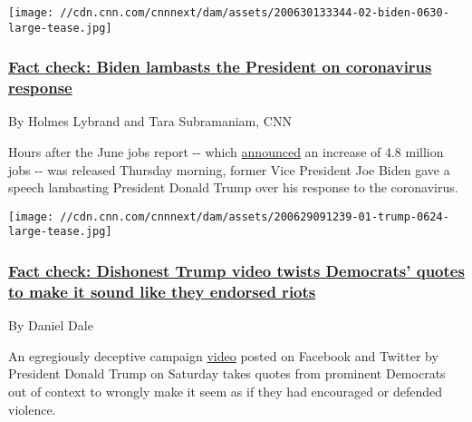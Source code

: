 \texttt{[image: //cdn.cnn.com/cnnnext/dam/assets/200630133344-02-biden-0630-large-tease.jpg]}

\hypertarget{fact-check-biden-lambasts-the-president-on-coronavirus-response-}{%
\subsubsection{\texorpdfstring{\href{/2020/07/03/politics/joe-biden-attacks-donald-trump-on-coronavirus-fact-check/index.html}{Fact
check: Biden lambasts the President on coronavirus response
}}{Fact check: Biden lambasts the President on coronavirus response }}\label{fact-check-biden-lambasts-the-president-on-coronavirus-response-}}

By Holmes Lybrand and Tara Subramaniam, CNN

Hours after the June jobs report -\/- which
\href{https://www.cnn.com/2020/07/02/economy/june-2020-jobs-report-coronavirus/index.html}{announced}
an increase of 4.8 million jobs -\/- was released Thursday morning,
former Vice President Joe Biden gave a speech lambasting President
Donald Trump over his response to the coronavirus.

\href{/2020/06/29/politics/fact-check-dishonest-trump-video-democrats/index.html}{}

\texttt{[image: //cdn.cnn.com/cnnnext/dam/assets/200629091239-01-trump-0624-large-tease.jpg]}

\hypertarget{fact-check-dishonest-trump-video-twists-democrats-quotes-to-make-it-sound-like-they-endorsed-riots}{%
\subsubsection{\texorpdfstring{\href{/2020/06/29/politics/fact-check-dishonest-trump-video-democrats/index.html}{Fact
check: Dishonest Trump video twists Democrats' quotes to make it sound
like they endorsed
riots}}{Fact check: Dishonest Trump video twists Democrats' quotes to make it sound like they endorsed riots}}\label{fact-check-dishonest-trump-video-twists-democrats-quotes-to-make-it-sound-like-they-endorsed-riots}}

By Daniel Dale

An egregiously deceptive campaign
\href{https://www.facebook.com/watch/?v=2918759308249818\%20and\%20Twitter\%20https://twitter.com/realDonaldTrump/status/1276995624588709888?s=20}{video}
posted on Facebook and Twitter by President Donald Trump on Saturday
takes quotes from prominent Democrats out of context to wrongly make it
seem as if they had encouraged or defended violence.

